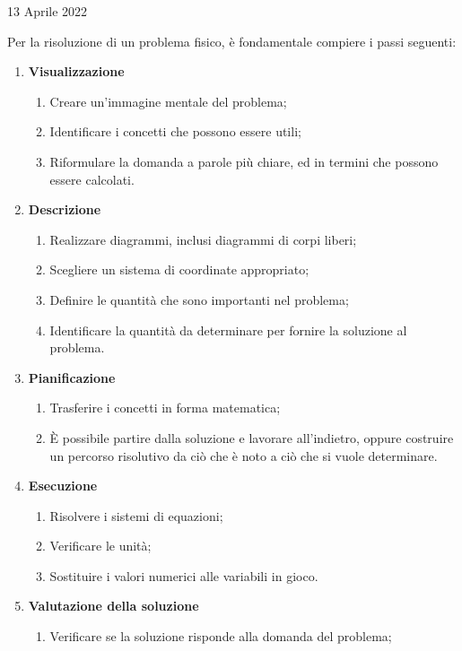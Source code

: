 \documentclass[a4paper]{extarticle}
\begin{document}
\newpage
\noindent
\begin{center}
  13 Aprile 2022
\end{center}
Per la risoluzione di un problema fisico, è fondamentale compiere i passi seguenti:
\begin{enumerate}
  \item \textbf{Visualizzazione}
  \begin{enumerate}
    \item Creare un'immagine mentale del problema;
    \item Identificare i concetti che possono essere utili;
    \item Riformulare la domanda a parole più chiare, ed in termini che possono essere calcolati.
  \end{enumerate}
  \item \textbf{Descrizione}
  \begin{enumerate}
    \item Realizzare diagrammi, inclusi diagrammi di corpi liberi;
    \item Scegliere un sistema di coordinate appropriato;
    \item Definire le quantità che sono importanti nel problema;
    \item Identificare la quantità da determinare per fornire la soluzione al problema.
  \end{enumerate}
  \item \textbf{Pianificazione}
  \begin{enumerate}
    \item Trasferire i concetti in forma matematica;
    \item È possibile partire dalla soluzione e lavorare all'indietro, oppure costruire un percorso risolutivo da ciò che è noto a ciò che si vuole determinare.
  \end{enumerate}
  \item \textbf{Esecuzione}
  \begin{enumerate}
    \item Risolvere i sistemi di equazioni;
    \item Verificare le unità;
    \item Sostituire i valori numerici alle variabili in gioco.
  \end{enumerate}
  \item \textbf{Valutazione della soluzione}
  \begin{enumerate}
    \item Verificare se la soluzione risponde alla domanda del problema;

\end{enumerate}
\end{enumerate}
\end{document}
